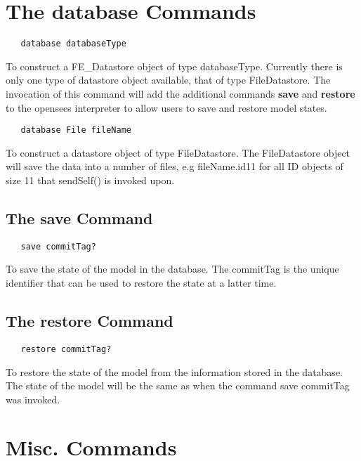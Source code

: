\documentclass[12pt]{article}
\begin{document}
\section {The database Commands}
{\sf\small
\begin{verbatim}
   database databaseType 
\end{verbatim}
}


\noindent To construct a FE\_Datastore object of type
databaseType. Currently there is only one type of datastore object
available, that of type FileDatastore. The invocation of this command
will add the additional commands {\bf save} and {\bf restore} to the
opensees interpreter to allow users to save and restore model states.

{\sf\small
\begin{verbatim}
   database File fileName
\end{verbatim}
} 

\noindent To construct a datastore object of type FileDatastore. The
FileDatastore object will save the data into a number of files, e.g
fileName.id11 for all ID objects of size 11 that sendSelf() is invoked
upon.

\subsection {The save Command}
{\sf\small
\begin{verbatim}
   save commitTag?
\end{verbatim}
} 

\noindent To save the state of the model in the database. The
commitTag is the unique identifier that can be used to restore the
state at a latter time.


\subsection {The restore Command}
{\sf\small
\begin{verbatim}
   restore commitTag?
\end{verbatim}
} 

\noindent To restore the state of the model from the information
stored in the database. The state of the model will be the same as 
when the command save commitTag was invoked.


\section {Misc. Commands}
\end{document}
